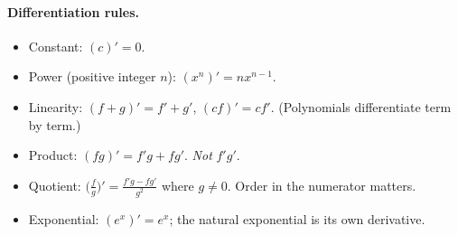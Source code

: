 \paragraph{Differentiation rules.}
\begin{itemize}
    \item Constant: \((c)' = 0\).
    \item Power (positive integer \(n\)): \((x^{n})' = n x^{n - 1}\).
    \item Linearity: \((f + g)' = f' + g'\), \((c f)' = c f'\). (Polynomials differentiate term by term.)
    \item Product: \((f g)' = f' g + f g'\). \emph{Not} \(f' g'\).
    \item Quotient: \(\bigl(\tfrac{f}{g}\bigr)' = \tfrac{f' g - f g'}{g^{2}}\) where \(g \neq 0\). Order in the numerator matters.
    \item Exponential: \((e^{x})' = e^{x}\); the natural exponential is its own derivative.
\end{itemize}


